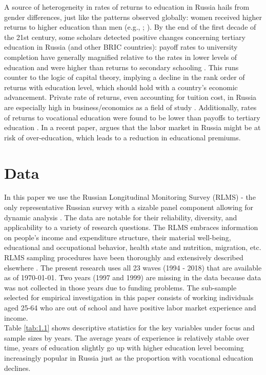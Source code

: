 \documentclass[alpha-refs]{wiley-article-01g}
\begin{document}
A source of heterogeneity in rates of returns to education in Russia hails from gender differences, just like the patterns observed globally: women received higher returns to higher education than men (e.g., \cite{Cheidvasser2007}; \cite{Lukyanova2010}). By the end of the first decade of the 21st century, some scholars detected positive changes concerning tertiary education in Russia (and other BRIC countries): payoff rates to university completion have generally magnified relative to the rates in lower levels of education and were higher than returns to secondary schooling \parencite{Carnoy2012}. This runs counter to the logic of capital theory, implying a decline in the rank order of returns with education level, which should hold with a country's economic advancement. Private rate of returns, even accounting for tuition cost, in Russia are especially high in business\slash economics as a field of study \parencite{Carnoy2012}. Additionally, rates of returns to vocational education were found to be lower than payoffs to tertiary education \parencite{Borisov2007}. In a recent paper, \cite{Gimpelson2019} argues that the labor market in Russia might be at risk of over-education, which leads to a reduction in educational premiums.

 
\section{Data}

In this paper we use the Russian Longitudinal Monitoring Survey (RLMS) - the only representative Russian survey with a sizable panel component allowing for dynamic analysis \parencite{Kozyreva2016}. The data are notable for their reliability, diversity, and applicability to a variety of research questions. The RLMS embraces information on people's income and expenditure structure, their material well-being, educational and occupational behavior, health state and nutrition, migration, etc.  RLMS sampling procedures have been thoroughly and extensively described elsewhere \parencite{Kozyreva2016}. The present research uses all 23 waves (1994 - 2018) that are available as of \today. Two years (1997 and 1999) are missing in the data because data was not collected in those years due to funding problems. The sub-sample selected for empirical investigation in this paper consists of working individuals aged 25-64 who are out of school and have positive labor market experience and income. 
\\

Table \ref{tab:1.1} shows descriptive statistics for the key variables under focus and sample sizes by years. The average years of experience is relatively stable over time, years of education slightly go up with higher education level becoming increasingly popular in Russia just as the proportion with vocational education declines. 
\end{document}
